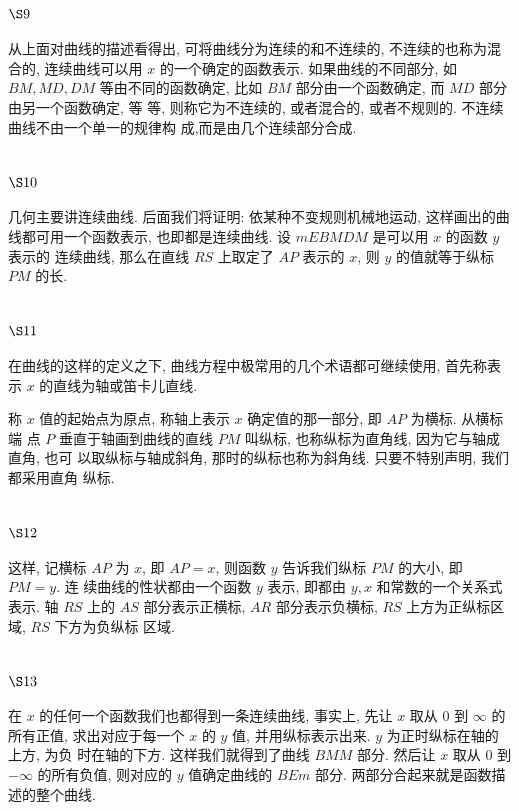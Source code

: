 \section{$\S 9$}

从上面对曲线的描述看得出, 可将曲线分为连续的和不连续的, 不连续的也称为混 合的, 连续曲线可以用 $x$ 的一个确定的函数表示. 如果曲线的不同部分, 如 $B M, M D, D M$ 等由不同的函数确定, 比如 $B M$ 部分由一个函数确定, 而 $M D$ 部分由另一个函数确定, 等 等, 则称它为不连续的, 或者混合的, 或者不规则的. 不连续曲线不由一个单一的规律构 成,而是由几个连续部分合成.

\section{$\S 10$}

几何主要讲连续曲线. 后面我们将证明: 依某种不变规则机械地运动, 这样画出的曲 线都可用一个函数表示, 也即都是连续曲线. 设 $m E B M D M$ 是可以用 $x$ 的函数 $y$ 表示的 连续曲线, 那么在直线 $R S$ 上取定了 $A P$ 表示的 $x$, 则 $y$ 的值就等于纵标 $P M$ 的长.

\section{$\S 11$}

在曲线的这样的定义之下, 曲线方程中极常用的几个术语都可继续使用, 首先称表 示 $x$ 的直线为轴或笛卡儿直线.

称 $x$ 值的起始点为原点, 称轴上表示 $x$ 确定值的那一部分, 即 $A P$ 为横标. 从横标端 点 $P$ 垂直于轴画到曲线的直线 $P M$ 叫纵标, 也称纵标为直角线, 因为它与轴成直角, 也可 以取纵标与轴成斜角, 那时的纵标也称为斜角线. 只要不特别声明, 我们都采用直角 纵标.

\section{$\S 12$}

这样, 记横标 $A P$ 为 $x$, 即 $A P=x$, 则函数 $y$ 告诉我们纵标 $P M$ 的大小, 即 $P M=y$. 连 续曲线的性状都由一个函数 $y$ 表示, 即都由 $y, x$ 和常数的一个关系式表示. 轴 $R S$ 上的 $A S$ 部分表示正横标, $A R$ 部分表示负横标, $R S$ 上方为正纵标区域, $R S$ 下方为负纵标 区域.

\section{$\S 13$}

在 $x$ 的任何一个函数我们也都得到一条连续曲线, 事实上, 先让 $x$ 取从 0 到 $\infty$ 的所有正值, 求出对应于每一个 $x$ 的 $y$ 值, 并用纵标表示出来. $y$ 为正时纵标在轴的上方, 为负 时在轴的下方. 这样我们就得到了曲线 $B M M$ 部分. 然后让 $x$ 取从 0 到 $-\infty$ 的所有负值, 则对应的 $y$ 值确定曲线的 $B E m$ 部分. 两部分合起来就是函数描述的整个曲线.


